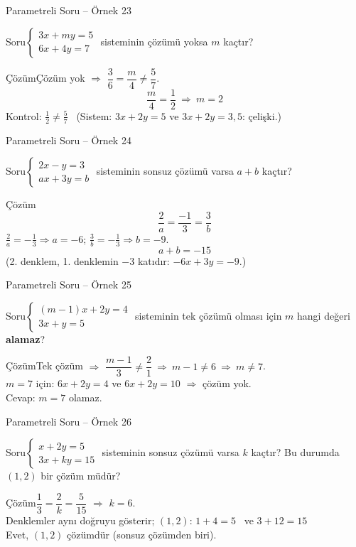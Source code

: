 \documentclass[aspectratio=169,11pt]{beamer}
\newcommand{\soru}[3]{%
\begin{frame}{#1}
  \begin{block}{Soru}\large #2\end{block}
  \pause
  \begin{exampleblock}{Çözüm}\large #3\end{exampleblock}
\end{frame}}
\begin{document}
\soru{Parametreli Soru -- Örnek 23}
{\(\begin{cases}3x+my=5\\ 6x+4y=7\end{cases}\) \quad sisteminin çözümü yoksa \(m\) kaçtır?}
{Çözüm yok \(\Rightarrow\) \(\dfrac{3}{6}=\dfrac{m}{4}\neq\dfrac{5}{7}\).
\[\frac{m}{4}=\frac12\ \Rightarrow\ m=2\]
Kontrol: \(\frac12\neq\frac57\) \checkmark \ (Sistem: \(3x+2y=5\) ve \(3x+2y=3{,}5\): çelişki.)}

\soru{Parametreli Soru -- Örnek 24}
{\(\begin{cases}2x-y=3\\ ax+3y=b\end{cases}\) \quad sisteminin sonsuz çözümü varsa \(a+b\) kaçtır?}
{\[\frac{2}{a}=\frac{-1}{3}=\frac{3}{b}\]
\(\frac{2}{a}=-\frac13\Rightarrow a=-6\); \quad \(\frac{3}{b}=-\frac13\Rightarrow b=-9\).
\[a+b=-15\]
(2. denklem, 1. denklemin \(-3\) katıdır: \(-6x+3y=-9\).)}

\soru{Parametreli Soru -- Örnek 25}
{\(\begin{cases}(m-1)x+2y=4\\ 3x+y=5\end{cases}\) \quad sisteminin tek çözümü olması için \(m\) hangi değeri \textbf{alamaz}?}
{Tek çözüm \(\Rightarrow\) \(\dfrac{m-1}{3}\neq\dfrac{2}{1}\ \Rightarrow\ m-1\neq 6\ \Rightarrow\ m\neq 7\).\\[3pt]
\(m=7\) için: \(6x+2y=4\) ve \(6x+2y=10\) \(\Rightarrow\) çözüm yok.\\[3pt]
Cevap: \(m=7\) olamaz.}

\soru{Parametreli Soru -- Örnek 26}
{\(\begin{cases}x+2y=5\\ 3x+ky=15\end{cases}\) \quad sisteminin sonsuz çözümü varsa \(k\) kaçtır? Bu durumda \((1,2)\) bir çözüm müdür?}
{\(\dfrac13=\dfrac{2}{k}=\dfrac{5}{15}\) \(\Rightarrow\) \(k=6\).\\[3pt]
Denklemler aynı doğruyu gösterir; \((1,2)\): \(1+4=5\) \checkmark \ ve \(3+12=15\) \checkmark\\[3pt]
Evet, \((1,2)\) çözümdür (sonsuz çözümden biri).}
\end{document}
